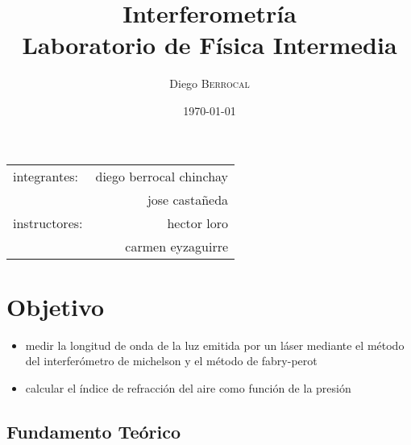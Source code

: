 \documentclass{article}
\title{Interferometría\\ Laboratorio de Física Intermedia} %
\author{Diego \textsc{Berrocal}} %
\date{\today} %
\begin{document}
\maketitle %

\begin{center}
  \begin{tabular}{l r}
    integrantes: & diego berrocal chinchay\\ %
    & jose castañeda\\
    instructores: & hector loro \\ & carmen eyzaguirre
  \end{tabular}
\end{center}



\section{Objetivo}

\begin{itemize}
\item medir la longitud de onda de la luz emitida por un láser
  mediante el método del interferómetro de michelson y el método de
  fabry-perot
\item calcular el índice de refracción del aire como función de la
  presión

\end{itemize}


\subsection{Fundamento Teórico}
\end{document}
